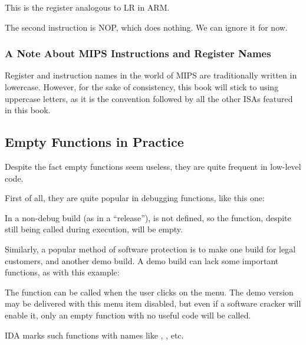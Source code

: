 This is the register analogous to \ac{LR} in ARM.

The second instruction is \ac{NOP}, which does nothing.
We can ignore it for now.

\subsubsection{A Note About MIPS Instructions and Register Names}

Register and instruction names in the world of MIPS are traditionally written in lowercase.
However, for the sake of consistency, this book will stick to using uppercase letters,
as it is the convention followed by all the other \ac{ISA}s featured in this book.

\subsection{Empty Functions in Practice}

Despite the fact empty functions seem useless, they are quite frequent in low-level code.

First of all, they are quite popular in debugging functions, like this one:



In a non-debug build (as in a ``release''),  is not defined,
so the  function, despite still being called during execution,
will be empty.

Similarly, a popular method of software protection is to make one build for legal customers, and another demo build.
A demo build can lack some important functions, as with this example:



The  function can be called when the user clicks  on the menu.
The demo version may be delivered with this menu item disabled, but even if a software cracker will enable it,
only an empty function with no useful code will be called.

IDA marks such functions with names like , , etc.

